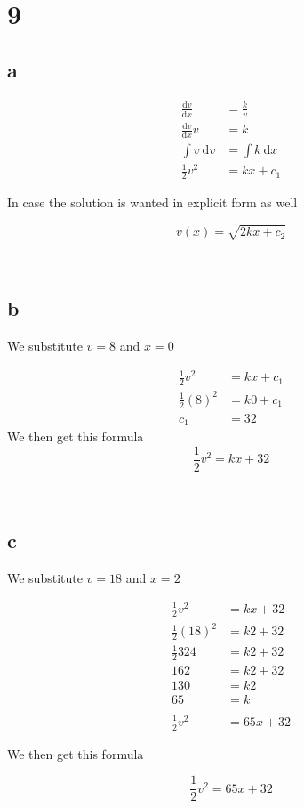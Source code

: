 \documentclass{article}
\newcommand{\md}{~\mathrm d}
\newcommand{\Md}{\mathrm d}
\newcommand{\blankpage}{
    \newpage
    \
    \newpage
}
\begin{document}
\blankpage
\section{9}
\subsection{a}

\begin{align*}
    \frac{\Md v}{\Md x} &= \frac kv \\
    \frac{\Md v}{\Md x}v &= k \\
    \int v\md v &= \int k\md x \\
    \frac12v^2 &= kx + c_1
\end{align*}

In case the solution is wanted in explicit form as well

$$v(x) = \sqrt{2kx + c_2}$$

\blankpage
\subsection{b}

We substitute $v=8$ and $x=0$

\begin{align*}
    \frac12v^2 &= kx + c_1 \\
    \frac12(8)^2 &= k0 + c_1 \\
    c_1 &= 32
\end{align*}
We then get this formula
$$ \frac12v^2 = kx + 32 $$

\blankpage
\subsection{c}

We substitute $v=18$ and $x=2$

\begin{align*}
    \frac12v^2 &= kx + 32 \\
    \frac12(18)^2 &= k2 + 32 \\
    \frac12 324 &= k2 + 32 \\
    162 &= k2 + 32 \\
    130 &= k2 \\
    65 &= k \\ \\
    \frac12v^2 &= 65x + 32
\end{align*}

We then get this formula

$$ \frac12v^2 = 65x + 32 $$
\end{document}
